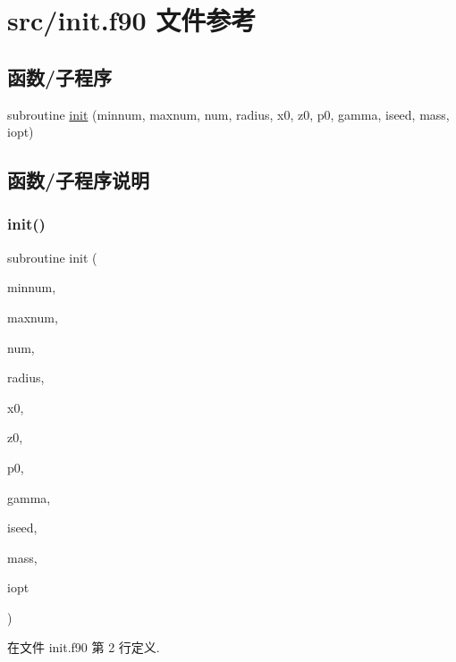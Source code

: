 \hypertarget{init_8f90}{}\section{src/init.f90 文件参考}
\label{init_8f90}
\subsection*{函数/子程序}
\begin{DoxyCompactItemize}
\item 
subroutine \mbox{\hyperlink{init_8f90_a925211caea512f352d748dcedd82d0ff}{init}} (minnum, maxnum, num, radius, x0, z0, p0, gamma, iseed, mass, iopt)
\end{DoxyCompactItemize}


\subsection{函数/子程序说明}
\mbox{\label{init_8f90_a925211caea512f352d748dcedd82d0ff}} 
\subsubsection{\texorpdfstring{init()}{init()}}
{\footnotesize\ttfamily subroutine init (\begin{DoxyParamCaption}\item[{}]{minnum,  }\item[{}]{maxnum,  }\item[{}]{num,  }\item[{}]{radius,  }\item[{}]{x0,  }\item[{}]{z0,  }\item[{}]{p0,  }\item[{}]{gamma,  }\item[{}]{iseed,  }\item[{}]{mass,  }\item[{}]{iopt }\end{DoxyParamCaption})}



在文件 init.\+f90 第 2 行定义.

